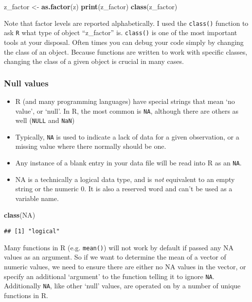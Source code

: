 \documentclass[]{book}
\newenvironment{Shaded}{\begin{snugshade}}{\end{snugshade}}
\newcommand{\KeywordTok}[1]{\textcolor[rgb]{0.13,0.29,0.53}{\textbf{#1}}}
\newcommand{\NormalTok}[1]{#1}
\newcommand{\OtherTok}[1]{\textcolor[rgb]{0.56,0.35,0.01}{#1}}
\newcommand{\StringTok}[1]{\textcolor[rgb]{0.31,0.60,0.02}{#1}}
\begin{document}
\begin{Shaded}
\begin{Highlighting}[]
\NormalTok{z_factor <-}\StringTok{ }\KeywordTok{as.factor}\NormalTok{(z)}
\KeywordTok{print}\NormalTok{(z_factor)}
\KeywordTok{class}\NormalTok{(z_factor)}
\end{Highlighting}
\end{Shaded}

Note that factor levels are reported alphabetically. I used the \texttt{class()} function to ask \texttt{R} what type of object ``z\_factor'' is. \texttt{class()} is one of the most important tools at your disposal. Often times you can debug your code simply by changing the class of an object. Because functions are written to work with specific classes, changing the class of a given object is crucial in many cases.

\hypertarget{null-values}{%
\subsubsection{Null values}\label{null-values}}

\begin{itemize}
\item
  R (and many programming languages) have special strings that mean `no value', or `null'. In R, the most common is \texttt{NA}, although there are others as well (\texttt{NULL} and \texttt{NaN})
\item
  Typically, \texttt{NA} is used to indicate a lack of data for a given observation, or a missing value where there normally should be one.
\item
  Any instance of a blank entry in your data file will be read into R as an \texttt{NA}.
\item
  NA is a technically a logical data type, and is \emph{not} equivalent to an empty string or the numeric 0. It is also a reserved word and can't be used as a variable name.
\end{itemize}

\begin{Shaded}
\begin{Highlighting}[]
\KeywordTok{class}\NormalTok{(}\OtherTok{NA}\NormalTok{)}
\end{Highlighting}
\end{Shaded}

\begin{verbatim}
## [1] "logical"
\end{verbatim}

Many functions in R (e.g. \texttt{mean()}) will not work by default if passed any NA values as an argument. So if we want to determine the mean of a vector of numeric values, we need to ensure there are either no NA values in the vector, or specify an additional `argument' to the function telling it to ignore \texttt{NA}. Additionally \texttt{NA}, like other `null' values, are operated on by a number of unique functions in R.
\end{document}
